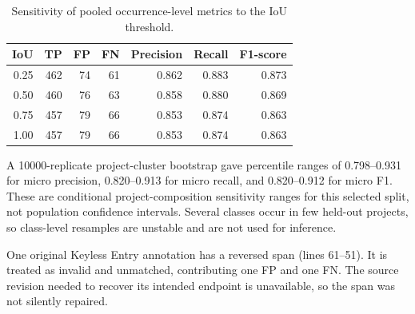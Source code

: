 \begin{table}[H]
    \centering
    \caption{Sensitivity of pooled occurrence-level metrics to the IoU threshold.}
    \label{tab:iouSensitivity}
    \begin{tabular}{rrrrrrr}
        \hline
        \textbf{IoU} & \textbf{TP} & \textbf{FP} & \textbf{FN} & \textbf{Precision} & \textbf{Recall} & \textbf{F1-score} \\
        \hline
        0.25 & 462 & 74 & 61 & 0.862 & 0.883 & 0.873 \\
        0.50 & 460 & 76 & 63 & 0.858 & 0.880 & 0.869 \\
        0.75 & 457 & 79 & 66 & 0.853 & 0.874 & 0.863 \\
        1.00 & 457 & 79 & 66 & 0.853 & 0.874 & 0.863 \\
        \hline
    \end{tabular}
\end{table}

A \num{10000}-replicate project-cluster bootstrap gave percentile ranges of \num{0.798}--\num{0.931} for micro precision, \num{0.820}--\num{0.913} for micro recall, and \num{0.820}--\num{0.912} for micro F1. These are conditional project-composition sensitivity ranges for this selected split, not population confidence intervals. Several classes occur in few held-out projects, so class-level resamples are unstable and are not used for inference.

One original Keyless Entry annotation has a reversed span (lines \num{61}--\num{51}). It is treated as invalid and unmatched, contributing one FP and one FN. The source revision needed to recover its intended endpoint is unavailable, so the span was not silently repaired.

